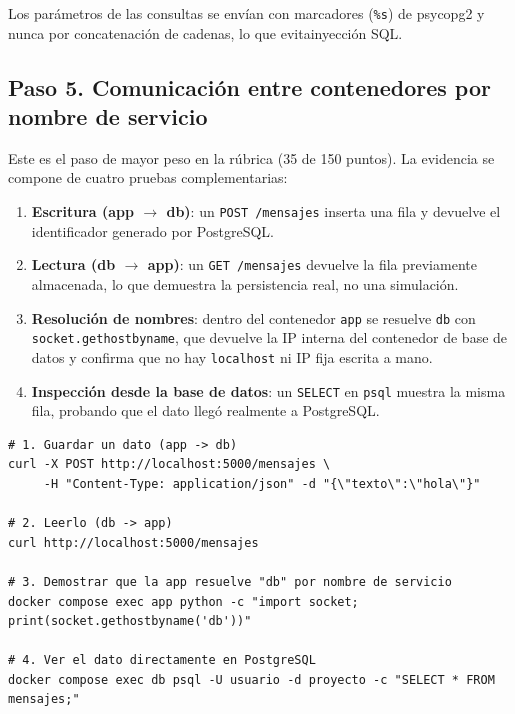 \documentclass[12pt,a4paper]{article}
\begin{document}
Los par\'ametros de las consultas se env\'ian con marcadores (\texttt{\%s}) de psycopg2 y
nunca por concatenaci\'on de cadenas, lo que evitainyecci\'on SQL.

\subsection{Paso 5. Comunicaci\'on entre contenedores por nombre de servicio}

Este es el paso de mayor peso en la r\'ubrica (35 de 150 puntos). La evidencia se compone de
cuatro pruebas complementarias:

\begin{enumerate}
  \item \textbf{Escritura (app $\rightarrow$ db)}: un \texttt{POST /mensajes} inserta una
        fila y devuelve el identificador generado por PostgreSQL.
  \item \textbf{Lectura (db $\rightarrow$ app)}: un \texttt{GET /mensajes} devuelve la fila
        previamente almacenada, lo que demuestra la persistencia real, no una simulaci\'on.
  \item \textbf{Resoluci\'on de nombres}: dentro del contenedor \texttt{app} se resuelve
        \texttt{db} con \texttt{socket.\allowbreak gethostbyname}, que devuelve la IP interna del
        contenedor de base de datos y confirma que no hay \texttt{localhost} ni IP fija
        escrita a mano.
  \item \textbf{Inspecci\'on desde la base de datos}: un \texttt{SELECT} en \texttt{psql}
        muestra la misma fila, probando que el dato lleg\'o realmente a PostgreSQL.
\end{enumerate}

\begin{lstlisting}[caption=Comandos de verificacion de la comunicacion,style=estiloshell]
# 1. Guardar un dato (app -> db)
curl -X POST http://localhost:5000/mensajes \
     -H "Content-Type: application/json" -d "{\"texto\":\"hola\"}"

# 2. Leerlo (db -> app)
curl http://localhost:5000/mensajes

# 3. Demostrar que la app resuelve "db" por nombre de servicio
docker compose exec app python -c "import socket; print(socket.gethostbyname('db'))"

# 4. Ver el dato directamente en PostgreSQL
docker compose exec db psql -U usuario -d proyecto -c "SELECT * FROM mensajes;"
\end{lstlisting}
\end{document}
